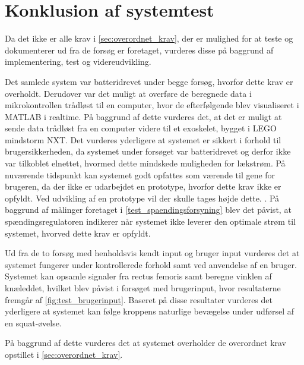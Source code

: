 \section{Konklusion af systemtest}
Da det ikke er alle krav i \autoref{sec:overordnet_krav}, der er mulighed for at teste og dokumenterer ud fra de forsøg er foretaget, vurderes disse på baggrund af implementering, test og videreudvikling. 

Det samlede system var batteridrevet under begge forsøg, hvorfor dette krav er overholdt. Derudover var det muligt at overføre de beregnede data i mikrokontrollen trådløst til en computer, hvor de efterfølgende blev visualiseret i MATLAB i realtime. På baggrund af dette vurderes det, at det er muligt at sende data trådløst fra en computer videre til et exoskelet, bygget i LEGO mindstorm NXT. Det vurderes yderligere at systemet er sikkert i forhold til brugersikkerheden, da systemet under forsøget var batteridrevet og derfor ikke var tilkoblet elnettet, hvormed dette mindskede muligheden for lækstrøm. 
På nuværende tidspunkt kan systemet godt opfattes som værende til gene for brugeren, da der ikke er udarbejdet en prototype, hvorfor dette krav ikke er opfyldt. Ved udvikling af en prototype vil der skulle tages højde dette. . 
På baggrund af målinger foretaget i \autoref{test_spaendingsforsyning} blev det påvist, at spændingsregulatoren indikerer når systemet ikke leverer den optimale strøm til systemet, hvorved dette krav er opfyldt. 

Ud fra de to forsøg med henholdsvis kendt input og bruger input vurderes det at systemet fungerer under kontrollerede forhold samt ved anvendelse af en bruger. Systemet kan opsamle signaler fra rectus femoris samt beregne vinklen af knæleddet, hvilket blev påvist i forsøget med brugerinput, hvor resultaterne fremgår af \autoref{fig:test_brugerinput}. Baseret på disse resultater vurderes det yderligere at systemet kan følge kroppens naturlige bevægelse under udførsel af en squat-øvelse. 

På baggrund af dette vurderes det at systemet overholder de overordnet krav opstillet i \autoref{sec:overordnet_krav}. 

